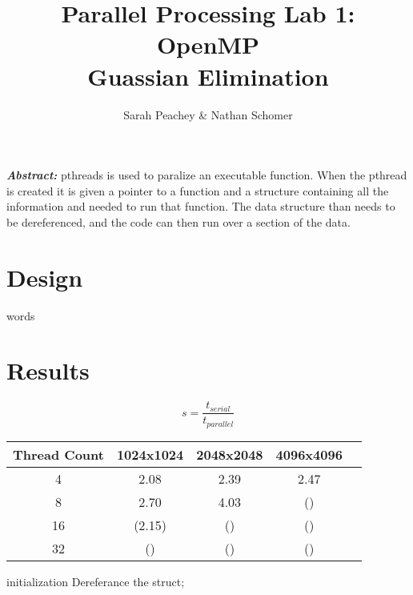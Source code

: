 \documentclass[12pt]{article}
\begin{document}
\title{Parallel Processing Lab 1: OpenMP \\ Guassian Elimination}
\author{Sarah Peachey \& Nathan Schomer}
\maketitle

\textbf{\textit{Abstract:}} pthreads is used to paralize an executable function. 
When the pthread is created it is given a pointer to a function and a structure containing 
all the information and needed to run that function. The data structure than needs to be 
dereferenced, and the code can then run over a section of the data. 

\newpage

\vspace{-1.5cm}
\section{Design}
\vspace{-0.25cm}
\qquad words 

\vspace{-0.6cm}
\section{Results}
\vspace{-0.4cm}
\qquad 


\begin{equation}
    s = \frac{t_{serial}}{t_{parallel}}
\end{equation}

\pagebreak
\begin{center}
\hspace*{-2.5cm}
\begin{tabular}{@{}|c|c|c|c|c|}
\hline
Thread Count & 1024x1024 & 2048x2048 & 4096x4096 \\
\hline
4 & 2.08 & 2.39 & 2.47 \\
\hline
8 & 2.70 & 4.03 & ()  \\
\hline 
16 & (2.15) & () & () \\
\hline 
32 & () & () & () \\
\hline
\end{tabular}
\hspace*{-2.5cm}
\end{center}

\vspace{1cm}
\begin{algorithm}[H]
\SetAlgoLined
{}
initialization\;
Dereferance the struct; 
\end{algorithm}

\end{document}
